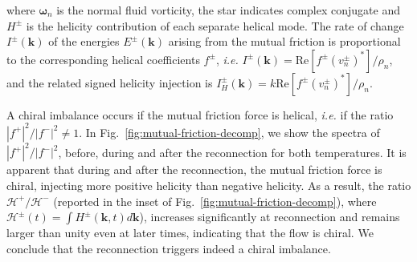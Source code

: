 \documentclass[%
 reprint,
 amsmath,amssymb,
 aps,
 prl,
]{revtex4-2}
\def \k{\mathbf{k}}
\begin{document}
\noindent 
where $\bm{\omega}_n$ is the normal fluid vorticity, the star indicates 
complex conjugate and $H^\pm$ is the helicity contribution of each 
separate helical mode. 
The rate of change $I^\pm(\k)$ of the energies $E^{\pm}(\k)$ arising from the mutual 
friction is proportional to the corresponding helical coefficients
$f^\pm$, \textit{i.e.} $I^\pm(\k) = \mathrm{Re} [f^\pm (v_n^\pm)^*] /\rho_n$, 
and the related signed helicity injection is 
$I_H^\pm(\k) = k \mathrm{Re} [f^\pm (v_n^\pm)^*] /\rho_n$. 

A chiral imbalance occurs if the mutual friction force is helical, 
\textit{i.e.} if the ratio $|f^+|^2/|f^-|^2 \neq 1$. 
In Fig.~\ref{fig:mutual-friction-decomp}, we show the spectra of $|f^+|^2/|f^-|^2$, 
before, during and after the reconnection for both temperatures. It is apparent
that during and after the reconnection, the mutual friction force is chiral,
injecting more positive helicity than negative helicity. 
As a result, the ratio $\mathcal{H}^+/\mathcal{H}^-$ 
(reported in the inset of Fig.~\ref{fig:mutual-friction-decomp}), 
where $\mathcal{H}^\pm (t) = \int\!\!H^\pm(\k,t)d\k$), 
increases significantly at reconnection and remains larger than unity even at later times, 
indicating that the flow is chiral. We conclude that the reconnection triggers indeed
a chiral imbalance.


  
\end{document}
